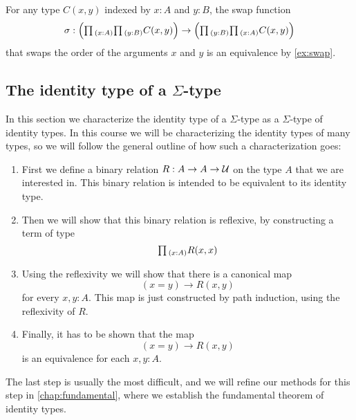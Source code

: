 \begin{eg}
  For any type $C(x,y)$ indexed by $x:A$ and $y:B$, the swap function
\begin{equation*}
\sigma:\Big(\prd{x:A}{y:B}C(x,y)\Big)\to\Big(\prd{y:B}{x:A}C(x,y)\Big)
\end{equation*}
that swaps the order of the arguments $x$ and $y$ is an equivalence by \cref{ex:swap}.
\end{eg}

\subsection{The identity type of a \texorpdfstring{$\Sigma$-}{dependent pair }type}

In this section we characterize the identity type of a $\Sigma$-type as a $\Sigma$-type of identity types. In this course we will be characterizing the identity types of many types, so we will follow the general outline of how such a characterization goes:
\begin{enumerate}
\item First we define a binary relation $R:A\to A\to \mathcal{U}$ on the type $A$ that we are interested in. This binary relation is intended to be equivalent to its identity type.
\item Then we will show that this binary relation is reflexive, by constructing a term of type
  \begin{equation*}
    \prd{x:A}R(x,x)
  \end{equation*}
\item Using the reflexivity we will show that there is a canonical map
  \begin{equation*}
    (x=y)\to R(x,y)
  \end{equation*}
  for every $x,y:A$. This map is just constructed by path induction, using the reflexivity of $R$.
\item Finally, it has to be shown that the map
  \begin{equation*}
    (x=y)\to R(x,y)
  \end{equation*}
  is an equivalence for each $x,y:A$. 
\end{enumerate}
The last step is usually the most difficult, and we will refine our methods for this step in \cref{chap:fundamental}, where we establish the fundamental theorem of identity types.

